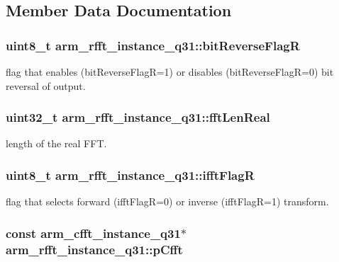 \subsection{Member Data Documentation}
\hypertarget{structarm__rfft__instance__q31_a3cb90cdc928a88b0203917dcb3dc1b71}{
\subsubsection[{bit\-Reverse\-Flag\-R}]{\setlength{\rightskip}{0pt plus 5cm}uint8\-\_\-t arm\-\_\-rfft\-\_\-instance\-\_\-q31\-::bit\-Reverse\-Flag\-R}}\label{structarm__rfft__instance__q31_a3cb90cdc928a88b0203917dcb3dc1b71}
flag that enables (bit\-Reverse\-Flag\-R=1) or disables (bit\-Reverse\-Flag\-R=0) bit reversal of output. \hypertarget{structarm__rfft__instance__q31_af777b0cadd5abaf064323692c2e6693b}{
\subsubsection[{fft\-Len\-Real}]{\setlength{\rightskip}{0pt plus 5cm}uint32\-\_\-t arm\-\_\-rfft\-\_\-instance\-\_\-q31\-::fft\-Len\-Real}}\label{structarm__rfft__instance__q31_af777b0cadd5abaf064323692c2e6693b}
length of the real F\-F\-T. \hypertarget{structarm__rfft__instance__q31_af5c2615e6cde15524df38fa57ea32d94}{
\subsubsection[{ifft\-Flag\-R}]{\setlength{\rightskip}{0pt plus 5cm}uint8\-\_\-t arm\-\_\-rfft\-\_\-instance\-\_\-q31\-::ifft\-Flag\-R}}\label{structarm__rfft__instance__q31_af5c2615e6cde15524df38fa57ea32d94}
flag that selects forward (ifft\-Flag\-R=0) or inverse (ifft\-Flag\-R=1) transform. \hypertarget{structarm__rfft__instance__q31_a8fe10d425b59e096c23aa4bb5caa1974}{
\subsubsection[{p\-Cfft}]{\setlength{\rightskip}{0pt plus 5cm}const {\bf arm\-\_\-cfft\-\_\-instance\-\_\-q31}$\ast$ arm\-\_\-rfft\-\_\-instance\-\_\-q31\-::p\-Cfft}}\label{structarm__rfft__instance__q31_a8fe10d425b59e096c23aa4bb5caa1974}
